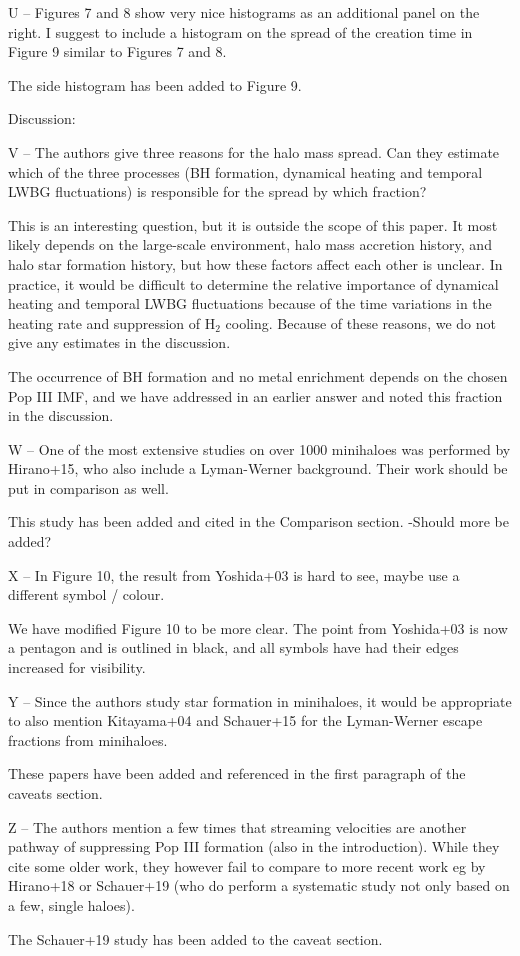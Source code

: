 \documentclass[11pt]{article}
\newenvironment{referee}[1][]{%
    \ignorespaces%
    \begin{mdframed}[style=myquotestyle,#1]%
}{%
    \end{mdframed}%
    \ignorespacesafterend%
}%
\begin{document}
\begin{referee}
U -- Figures 7 and 8 show very nice histograms as an additional panel on the right.  I suggest to include a histogram on the spread of the creation time in Figure 9 similar to Figures 7 and 8.
\end{referee}
The side histogram has been added to Figure 9. 

\begin{referee}
Discussion:

V -- The authors give three reasons for the halo mass spread. Can they estimate which of the three processes (BH formation, dynamical heating and temporal LWBG fluctuations) is responsible for the spread by which fraction?
\end{referee}

This is an interesting question, but it is outside the scope of this paper.  It most likely depends on the large-scale environment, halo mass accretion history, and halo star formation history, but how these factors affect each other is unclear.  In practice, it would be difficult to determine the relative importance of dynamical heating and temporal LWBG fluctuations because of the time variations in the heating rate and suppression of H$_2$ cooling.  Because of these reasons, we do not give any estimates in the discussion.

The occurrence of BH formation and no metal enrichment depends on the chosen Pop III IMF, and we have addressed in an earlier answer and noted this fraction in the discussion.

\begin{referee}
W -- One of the most extensive studies on over 1000 minihaloes was performed by Hirano+15, who also include a Lyman-Werner background. Their work should be put in comparison as well.
\end{referee}
This study has been added and cited in the Comparison section.
-Should more be added?

\begin{referee}
X -- In Figure 10, the result from Yoshida+03 is hard to see, maybe use a different symbol / colour.
\end{referee}
We have modified Figure 10 to be more clear. The point from Yoshida+03 is now a pentagon and is outlined in black, and all symbols have had their edges increased for visibility.

\begin{referee}
Y -- Since the authors study star formation in minihaloes, it would be appropriate to also mention Kitayama+04 and Schauer+15 for the Lyman-Werner escape fractions from minihaloes.
\end{referee}
These papers have been added and referenced in the first paragraph of the caveats section. 

\begin{referee}
Z -- The authors mention a few times that streaming velocities are another pathway of suppressing Pop III formation (also in the introduction). While they cite some older work, they however fail to compare to more recent work eg by Hirano+18 or Schauer+19 (who do perform a systematic study not only based on a few, single haloes).
\end{referee}
The Schauer+19 study has been added to the caveat section.
\end{document}
